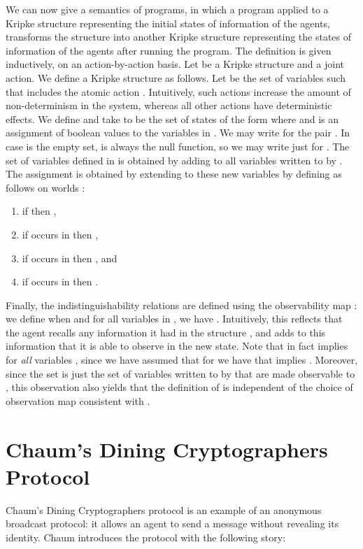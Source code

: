 \documentclass[]{llncs}
\newcommand{\be}{\begin{enumerate}}
\newcommand{\ee}{\end{enumerate}}
\begin{document}
We can now give a semantics of programs,  in which a program applied to a Kripke structure
representing the  initial states of information of the agents, 
transforms the structure into another Kripke structure  representing 
the states of information of the agents after running the program. The definition is 
given inductively, on an action-by-action basis. 
Let  be  a Kripke structure and 
 a joint action. We define a Kripke structure 
 as follows. 
Let  be the set of variables  such that  includes
the atomic action . Intuitively, such actions increase the 
amount of non-determinism in the system, whereas all other actions  
have deterministic effects. We define
 and take   to be the set of states of the form  where 
 and   is 
an assignment of boolean values to the variables  in . 
We may write  for the pair . 
In case  is the empty set,  is always the null
 function, so we 
may write just  for . The set  of variables defined in 
 is obtained by adding to  all variables written to by . 
The assignment  is obtained by extending  to these new variables
by defining  as follows on worlds : 
\be
\item if  then  , 
\item if  occurs in  then  , 
\item if  occurs in  then , and 
\item if  occurs in  then .  
\ee 
Finally, the indistinguishability relations  are defined using the observability map 
: we define 
 when  
and for all variables  in , we have . 
Intuitively, this reflects that the agent recalls any information it had in the structure , 
and adds to this information that it is able to observe in the new state. 
Note that in fact  implies 
for {\em all} variables , 
since we have assumed that for  we have that   implies . 
Moreover, since the set  is just the set of 
variables written to by  that are made observable to , this observation 
also yields that the definition of  is independent of the 
choice of observation map  consistent with . 

\section{Chaum's Dining Cryptographers Protocol}\label{sec:DC} 

Chaum's Dining Cryptographers protocol is an example of an anonymous broadcast
protocol: it allows an agent to send a message without revealing
its  identity. Chaum introduces the protocol 
with the following story:
\end{document}
